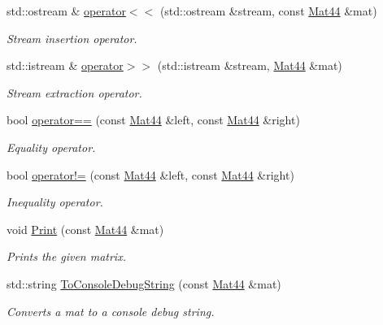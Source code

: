 \begin{DoxyCompactItemize}
\item 
std\+::ostream \& \hyperlink{classgfxmath_1_1_mat44_a3fe91a98667ad47a13792a3910edc689}{operator$<$$<$} (std\+::ostream \&stream, const \hyperlink{classgfxmath_1_1_mat44}{Mat44} \&mat)
\begin{DoxyCompactList}\small\item\em Stream insertion operator. \end{DoxyCompactList}\item 
std\+::istream \& \hyperlink{classgfxmath_1_1_mat44_addb2505fe2722a6fe1e02f4f7fefbae6}{operator$>$$>$} (std\+::istream \&stream, \hyperlink{classgfxmath_1_1_mat44}{Mat44} \&mat)
\begin{DoxyCompactList}\small\item\em Stream extraction operator. \end{DoxyCompactList}\item 
bool \hyperlink{classgfxmath_1_1_mat44_af4dc2dcc368fc35c6fd456a0bb87f7a2}{operator==} (const \hyperlink{classgfxmath_1_1_mat44}{Mat44} \&left, const \hyperlink{classgfxmath_1_1_mat44}{Mat44} \&right)
\begin{DoxyCompactList}\small\item\em Equality operator. \end{DoxyCompactList}\item 
bool \hyperlink{classgfxmath_1_1_mat44_acbc1598a85e4db1071aa8b4f005ad422}{operator!=} (const \hyperlink{classgfxmath_1_1_mat44}{Mat44} \&left, const \hyperlink{classgfxmath_1_1_mat44}{Mat44} \&right)
\begin{DoxyCompactList}\small\item\em Inequality operator. \end{DoxyCompactList}\item 
void \hyperlink{classgfxmath_1_1_mat44_a29435fda8e5d65db573dadafee977651}{Print} (const \hyperlink{classgfxmath_1_1_mat44}{Mat44} \&mat)
\begin{DoxyCompactList}\small\item\em Prints the given matrix. \end{DoxyCompactList}\item 
std\+::string \hyperlink{classgfxmath_1_1_mat44_a5d850a4033c3297037241bf1c9ba6223}{To\+Console\+Debug\+String} (const \hyperlink{classgfxmath_1_1_mat44}{Mat44} \&mat)
\begin{DoxyCompactList}\small\item\em Converts a mat to a console debug string. \end{DoxyCompactList}\end{DoxyCompactItemize}
